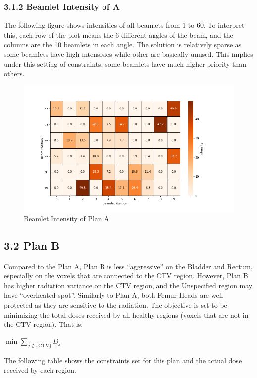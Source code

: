 \documentclass{report}
\begin{document}
\subsubsection{3.1.2 Beamlet Intensity of A}
The following figure shows intensities of all beamlets from 1 to 60. To interpret this, each row of the plot means the 6 different angles of the beam, and the columns are the 10 beamlets in each angle. The solution is relatively sparse as some beamlets have high intensities while other are basically unused. This implies under this setting of constraints, some beamlets have much higher priority than others.
\begin{figure}[H]
    \centering
    \includegraphics[width=0.6\columnwidth]{a-intensity.png}
    \caption{Beamlet Intensity of Plan A}
    
\end{figure}

\subsection{3.2 Plan B}

Compared to the Plan A, Plan B is less ``aggressive'' on the Bladder and Rectum, especially on the voxels that are connected to the CTV region. However, Plan B has higher radiation variance on the CTV region, and the Unspecified region may have ``overheated spot''. Similarly to Plan A, both Femur Heads are well protected as they are sensitive to the radiation. The objective is set to be minimizing the total doses received by all healthy regions (voxels that are not in the CTV region). That is:

\begin{center}
    $\min \sum_{j \notin \{\text{CTV}\}} D_j$
\end{center}
The following table shows the constraints set for this plan and the actual dose received by each region.
\end{document}

